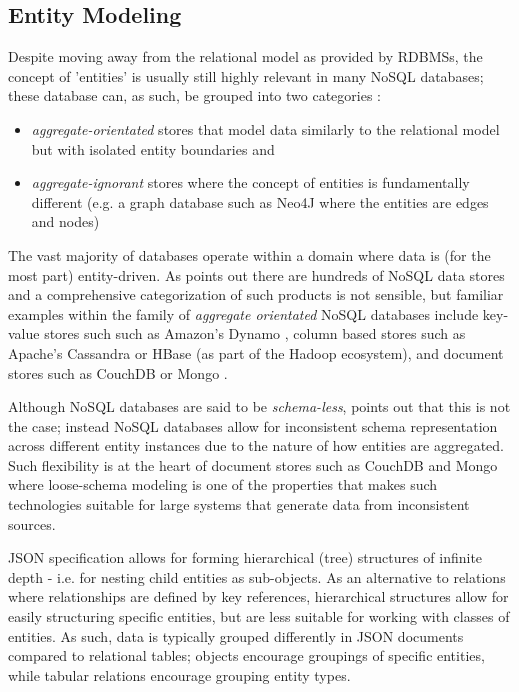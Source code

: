 \subsection{Entity Modeling}
Despite moving away from the relational model as provided by RDBMSs, the concept of 'entities' is usually still highly relevant in many NoSQL databases; these database can, as such, be grouped into two categories \cite{fowlerAggregate}:

\begin{itemize}
    \item \textit{aggregate-orientated} stores that model data similarly to the relational model but with isolated entity boundaries and
    \item \textit{aggregate-ignorant} stores where the concept of entities is fundamentally different (e.g. a graph database such as Neo4J \cite{sadalage2012} where the entities are edges and nodes)
\end{itemize}

The vast majority of databases operate within a domain where data is (for the most part) entity-driven. As \cite{GANESHCHANDRA201513} points out there are hundreds of NoSQL data stores and a comprehensive categorization of such products is not sensible, but familiar examples within the family of \textit{aggregate orientated} NoSQL databases include key-value stores such such as Amazon's Dynamo \cite{sadalage2012}, column based stores such as Apache's Cassandra \cite{sadalage2012} or HBase \cite{sadalage2012} (as part of the Hadoop ecosystem), and document stores such as CouchDB or Mongo \cite{sadalage2012}.

Although NoSQL databases are said to be \textit{schema-less}, \cite{ATZENI2016} points out that this is not the case; instead NoSQL databases allow for inconsistent schema representation across different entity instances due to the nature of how entities are aggregated. Such flexibility is at the heart of document stores such as CouchDB and Mongo where loose-schema modeling is one of the properties that makes such technologies suitable for large systems that generate data from inconsistent sources.

JSON specification allows for forming hierarchical (tree) structures of infinite depth - i.e. for nesting child entities as sub-objects. As an alternative to relations where relationships are defined by key references, hierarchical structures allow for easily structuring specific entities, but are less suitable for working with classes of entities. As such, data is typically grouped differently in JSON documents compared to relational tables; objects encourage groupings of specific entities, while tabular relations encourage grouping entity types.

